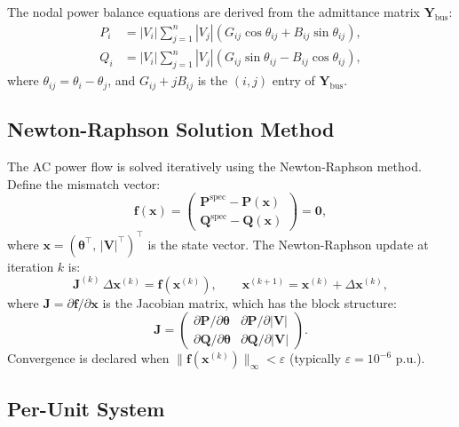 The nodal power balance equations are derived from the admittance matrix $\mathbf{Y}_\text{bus}$:
\begin{align}
    P_i &= |V_i| \sum_{j=1}^{n} |V_j|\left(G_{ij}\cos\theta_{ij} + B_{ij}\sin\theta_{ij}\right), \label{eq:ac_P}\\
    Q_i &= |V_i| \sum_{j=1}^{n} |V_j|\left(G_{ij}\sin\theta_{ij} - B_{ij}\cos\theta_{ij}\right), \label{eq:ac_Q}
\end{align}
where $\theta_{ij} = \theta_i - \theta_j$, and $G_{ij} + jB_{ij}$ is the $(i,j)$ entry of $\mathbf{Y}_\text{bus}$.

\subsection{Newton-Raphson Solution Method}

The AC power flow is solved iteratively using the Newton-Raphson method. Define the mismatch vector:
\begin{equation}
    \mathbf{f}(\mathbf{x}) = \begin{pmatrix} \mathbf{P}^\text{spec} - \mathbf{P}(\mathbf{x}) \\ \mathbf{Q}^\text{spec} - \mathbf{Q}(\mathbf{x}) \end{pmatrix} = \mathbf{0},
\end{equation}
where $\mathbf{x} = (\boldsymbol{\theta}^\top,\, |\mathbf{V}|^\top)^\top$ is the state vector. The Newton-Raphson update at iteration $k$ is:
\begin{equation}
    \mathbf{J}^{(k)}\,\Delta\mathbf{x}^{(k)} = \mathbf{f}(\mathbf{x}^{(k)}),
    \qquad
    \mathbf{x}^{(k+1)} = \mathbf{x}^{(k)} + \Delta\mathbf{x}^{(k)},
\end{equation}
where $\mathbf{J} = \partial\mathbf{f}/\partial\mathbf{x}$ is the Jacobian matrix, which has the block structure:
\begin{equation}
    \mathbf{J} = \begin{pmatrix} \partial\mathbf{P}/\partial\boldsymbol{\theta} & \partial\mathbf{P}/\partial|\mathbf{V}| \\ \partial\mathbf{Q}/\partial\boldsymbol{\theta} & \partial\mathbf{Q}/\partial|\mathbf{V}| \end{pmatrix}.
\end{equation}
Convergence is declared when $\|\mathbf{f}(\mathbf{x}^{(k)})\|_\infty < \varepsilon$ (typically $\varepsilon = 10^{-6}$ p.u.).

\subsection{Per-Unit System}

